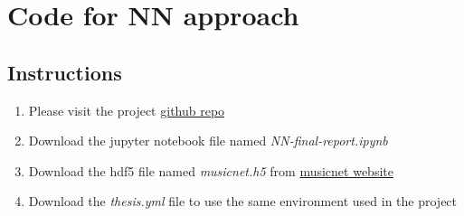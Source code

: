 \chapter{Code for NN approach}
\label{append:neural-networks}

\section{Instructions}
\begin{enumerate}
    \item Please visit the project \href{https://github.com/OliverIgnetik/engn4200_thesis}{github repo}
    \item Download the jupyter notebook file named \emph{NN-final-report.ipynb}
    \item Download the hdf5 file named \emph{musicnet.h5} from \href{https://homes.cs.washington.edu/~thickstn/musicnet.html}{musicnet website}
    \item Download the \emph{thesis.yml} file to use the same environment used in the project
\end{enumerate}
